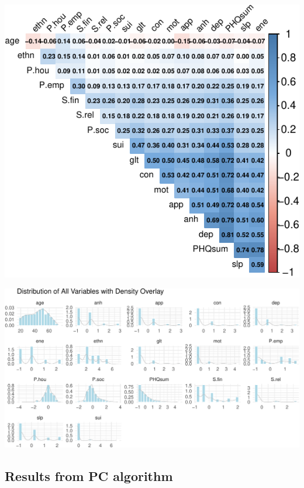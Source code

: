\documentclass[
]{article}
\begin{document}
\begin{center}
\includegraphics{draft_v1_files/figure-pdf/unnamed-chunk-18-1.pdf}
\end{center}

\begin{center}
\includegraphics{draft_v1_files/figure-pdf/unnamed-chunk-19-1.pdf}
\end{center}

\subsection{Results from PC algorithm}\label{results-from-pc-algorithm}
\end{document}
